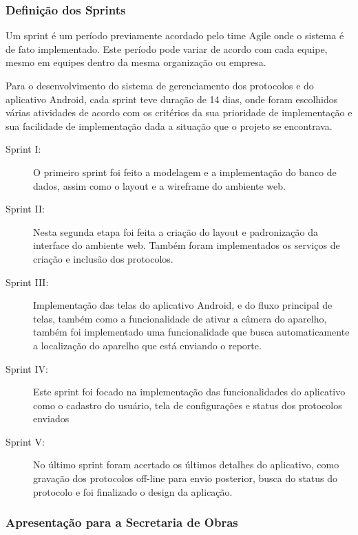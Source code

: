 \documentclass[
	article,			%
	11pt,				%
	oneside,			%
	a4paper,			%
	english,			%
	brazil,				%
	sumario=tradicional
	]{abntex2}
\begin{document}
\subsubsection{Definição dos Sprints}

Um sprint é um período previamente acordado pelo time Agile onde o sistema é de fato implementado.
Este período pode variar de acordo com cada equipe, mesmo em equipes dentro da mesma organização ou empresa.

Para o desenvolvimento do sistema de gerenciamento dos protocolos e do aplicativo Android, cada sprint teve duração de 14 dias, onde foram escolhidos várias atividades de acordo com os critérios da sua prioridade de implementação e sua facilidade de implementação dada a situação que o projeto se encontrava.

\begin{description}
\item[Sprint I:]
O primeiro sprint foi feito a modelagem e a implementação do banco de dados, assim como o layout e a wireframe do ambiente web.

\item[Sprint II:]
Nesta segunda etapa foi feita a criação do layout e padronização da interface do ambiente web.
Também foram implementados os serviços de criação e inclusão dos protocolos.

\item[Sprint III:]
Implementação das telas do aplicativo Android, e do fluxo principal de telas, também como a funcionalidade de ativar a câmera do aparelho, também foi implementado uma funcionalidade que busca automaticamente a localização do aparelho que está enviando o reporte.

\item[Sprint IV:]
Este sprint foi focado na implementação das funcionalidades do aplicativo como o cadastro do usuário, tela de configurações e status dos protocolos enviados

\item[Sprint V:]
No último sprint foram acertado os últimos detalhes do aplicativo, como gravação dos protocolos off-line para envio posterior, busca do status do protocolo e foi finalizado o design da aplicação.
\end{description}

\subsubsection{Apresentação para a Secretaria de Obras}
\end{document}
